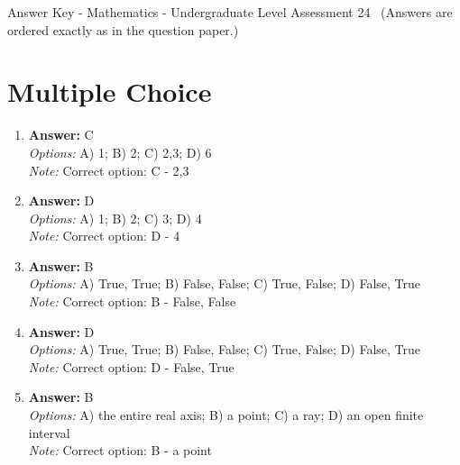 \documentclass[12pt]{article}
\begin{document}
\begin{center}
Answer Key - Mathematics - Undergraduate Level Assessment 24 \
\small (Answers are ordered exactly as in the question paper.)
\end{center}

\section*{Multiple Choice}
\begin{enumerate}[label=\arabic*.]
\item \textbf{Answer:} C
\\ \textit{Options:} A) 1; B) 2; C) 2,3; D) 6
\\ \textit{Note:} Correct option: C - 2,3
\item \textbf{Answer:} D
\\ \textit{Options:} A) 1; B) 2; C) 3; D) 4
\\ \textit{Note:} Correct option: D - 4
\item \textbf{Answer:} B
\\ \textit{Options:} A) True, True; B) False, False; C) True, False; D) False, True
\\ \textit{Note:} Correct option: B - False, False
\item \textbf{Answer:} D
\\ \textit{Options:} A) True, True; B) False, False; C) True, False; D) False, True
\\ \textit{Note:} Correct option: D - False, True
\item \textbf{Answer:} B
\\ \textit{Options:} A) the entire real axis; B) a point; C) a ray; D) an open finite interval
\\ \textit{Note:} Correct option: B - a point
\end{enumerate}
\end{document}
